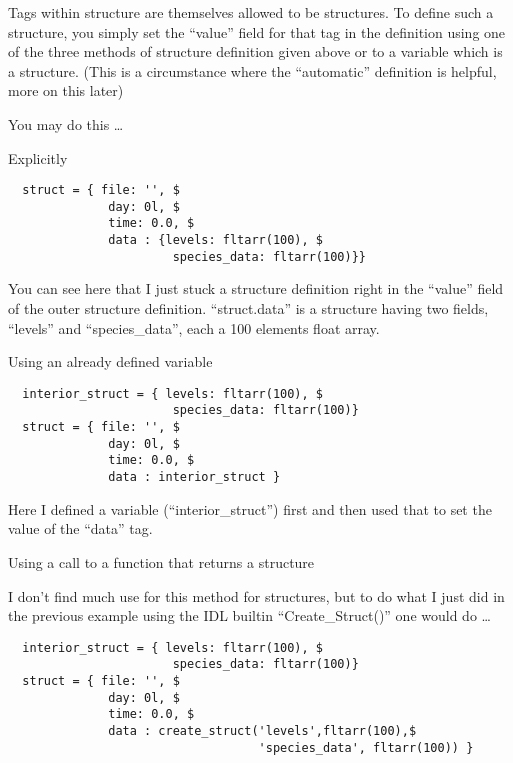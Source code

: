 Tags within structure are themselves allowed to be structures. To
define such a structure, you simply set the ``value'' field for that
tag in the definition using one of the three methods of structure
definition given above or to a variable which is a structure. (This is
a circumstance where the ``automatic'' definition is helpful, more on
this later)

You may do this \ldots

\bi 

  \item Explicitly

\begin{IDLExample}
\begin{verbatim}
  struct = { file: '', $
              day: 0l, $
              time: 0.0, $
              data : {levels: fltarr(100), $
                       species_data: fltarr(100)}}
\end{verbatim}
\end{IDLExample}

You can see here that I just stuck a structure definition right in the
``value'' field of the outer structure definition. ``struct.data'' is
a structure having two fields, ``levels'' and ``species\_data'', each
a 100 elements float array.

  \item Using an already defined variable


\begin{IDLExample}
\begin{verbatim}
  interior_struct = { levels: fltarr(100), $
                       species_data: fltarr(100)}
  struct = { file: '', $
              day: 0l, $
              time: 0.0, $
              data : interior_struct }
\end{verbatim}
\end{IDLExample}

Here I defined a variable (``interior\_struct'') first and then used
that to set the value of the ``data'' tag.

  \item Using a call to a function that returns a structure
    
    I don't find much use for this method for structures, but to do
    what I just did in the previous example using the IDL builtin
    ``Create\_Struct()'' one would do \ldots



\begin{IDLExample}
\begin{verbatim}
  interior_struct = { levels: fltarr(100), $
                       species_data: fltarr(100)}
  struct = { file: '', $
              day: 0l, $
              time: 0.0, $
              data : create_struct('levels',fltarr(100),$
                                   'species_data', fltarr(100)) }
\end{verbatim}
\end{IDLExample}

